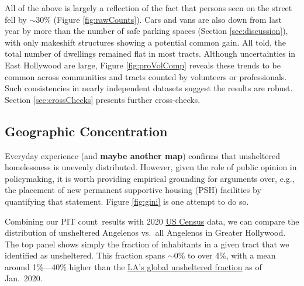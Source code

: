 \documentclass[11pt,twocolumn]{article}
\def\bfr{\bf\color{red}}
\def\Count{count}
\begin{document}
All of the above is largely a reflection of the fact that persons seen on the street fell by $\sim$30\%
(Figure \ref{fig:rawCounts}). Cars and vans are also down from last year by more than the number of 
safe parking spaces (Section \ref{sec:discussion}), with only makeshift structures showing a potential 
common gain. All told, the total number of dwellings remained flat in most tracts. Although uncertainties 
in East Hollywood are large, Figure \ref{fig:proVolComp} reveals these trends to be common across 
communities and tracts counted by volunteers or professionals. Such consistencies in nearly independent 
datasets suggest the results are robust. Section \ref{sec:crossChecks} presents further cross-checks.


\subsection{Geographic Concentration}
\label{sec:concentration}

Everyday experience (and {\bfr maybe another map}) confirms that unsheltered homelessness is
unevenly distributed. However, given the role of public opinion in policymaking, it is worth 
providing empirical grounding for arguments over, e.g., the placement of new permanent supportive 
housing (PSH) facilities by quantifying that statement. Figure \ref{fig:gini} is one attempt to do so. 

Combining our PIT \Count\ results with 2020 
\href{https://geomap.ffiec.gov/FFIECGeocMap/GeocodeMap1.aspx}{US Census} 
data, we can compare the distribution of unsheltered Angelenos vs.\ all Angelenos in Greater
Hollywood. The top panel shows simply the fraction of inhabitants in a given tract that we
identified as unsheltered. This fraction spans $\sim$0\% to over 4\%, with a mean around 
1\%---40\% higher than the \href{https://www.lahsa.org/documents?id=4680-2020-greater-los-angeles-homeless-count-city-of-los-angeles}{LA's global unsheltered fraction} as of Jan.~2020.
\end{document}
